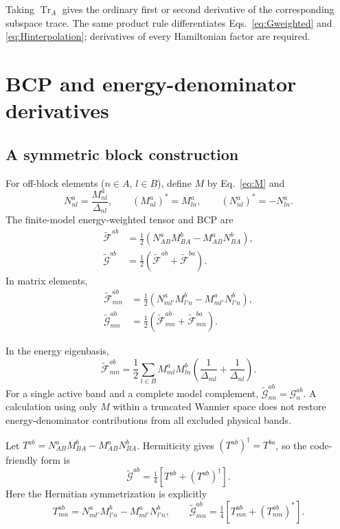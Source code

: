 \documentclass[prx,amsmath,amssymb,superscriptaddress,longbibliography]{revtex4-2}
\newcommand{\Tr}{\operatorname{Tr}}
\begin{document}
Taking $\Tr_A$ gives the ordinary first or second derivative of the
corresponding subspace trace.
The same product rule differentiates Eqs.~\eqref{eq:Gweighted} and
\eqref{eq:Hinterpolation}; derivatives of every Hamiltonian factor are required.

\section{BCP and energy-denominator derivatives}
\label{sec:bcp}

\subsection{A symmetric block construction}
For off-block elements ($n\in A$, $l\in B$), define $M$ by Eq.~\eqref{eq:M} and
\begin{equation}
 N_{nl}^a=\frac{M_{nl}^a}{\Delta_{nl}},\qquad
 (M_{nl}^a)^*=M_{ln}^a,\qquad (N_{nl}^a)^*=-N_{ln}^a.
 \label{eq:N}
\end{equation}
The finite-model energy-weighted tensor and BCP are
\begin{align}
 \widetilde{\mathcal F}^{ab}
 &=\tfrac12(N_{AB}^a M_{BA}^b-M_{AB}^a N_{BA}^b),\label{eq:weightedF}\\
 \widetilde{\mathcal{G}}^{ab}
 &=\tfrac12(\widetilde{\mathcal F}^{ab}+\widetilde{\mathcal F}^{ba}).
 \label{eq:bcp-block}
\end{align}
In matrix elements,
\begin{align}
 \widetilde{\mathcal F}_{mn}^{ab}
 &=\tfrac12(N_{ml'}^aM_{l'n}^b-M_{ml'}^aN_{l'n}^b),\nonumber\\
 \widetilde{\mathcal{G}}_{mn}^{ab}
 &=\tfrac12(\widetilde{\mathcal F}_{mn}^{ab}+\widetilde{\mathcal F}_{mn}^{ba}).
 \label{eq:bcp-product-components}
\end{align}

In the energy eigenbasis,
\begin{equation}
 \widetilde{\mathcal F}_{mn}^{ab}
 =\frac12\sum_{l\in B}M_{ml}^a M_{ln}^b
 \left(\frac1{\Delta_{ml}}+\frac1{\Delta_{nl}}\right).
 \label{eq:weightedF-components}
\end{equation}
For a single active band and a complete model complement,
$\widetilde{\mathcal{G}}_{nn}^{ab}=\mathcal{G}_n^{ab}$.
A calculation using only $M$ within a truncated Wannier space does not restore
energy-denominator contributions from all excluded physical bands.

Let $T^{ab}=N_{AB}^aM_{BA}^b-M_{AB}^aN_{BA}^b$.
Hermiticity gives $(T^{ab})^\dagger=T^{ba}$, so the code-friendly form is
\begin{equation}
 \widetilde{\mathcal{G}}^{ab}=\tfrac14[T^{ab}+(T^{ab})^\dagger].
 \label{eq:bcp-code}
\end{equation}
Here the Hermitian symmetrization is explicitly
\begin{equation}
 T_{mn}^{ab}=N_{ml'}^aM_{l'n}^b-M_{ml'}^aN_{l'n}^b,\qquad
 \widetilde{\mathcal{G}}_{mn}^{ab}
 =\tfrac14[T_{mn}^{ab}+(T_{nm}^{ab})^*].
 \label{eq:bcp-code-components}
\end{equation}
\end{document}
